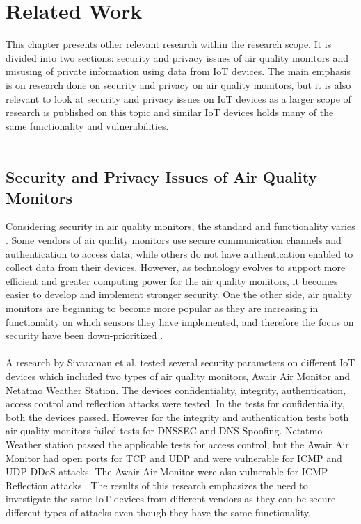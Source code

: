 \chapter{Related Work}
This chapter presents other relevant research within the research scope. It is divided into two sections: security and privacy issues of air quality monitors and misusing of private information using data from IoT devices. The main emphasis is on research done on security and privacy on air quality monitors, but it is also relevant to look at security and privacy issues on IoT devices as a larger scope of research is published on this topic and similar IoT devices holds many of the same functionality and vulnerabilities.\\\\
\section{Security and Privacy Issues of Air Quality Monitors}
Considering security in air quality monitors, the standard and functionality varies \cite{AQMHowFarFunctionality}. Some vendors of air quality monitors use secure communication channels and authentication to access data, while others do not have authentication enabled to collect data from their devices. However, as technology evolves to support more efficient and greater computing power for the air quality monitors, it becomes easier to develop and implement stronger security. One the other side, air quality monitors are beginning to become more popular as they are increasing in functionality on which sensors they have implemented, and therefore the focus on security have been down-prioritized \cite{SecurityAndDataIntInAQM}.
\\\\ 
A research by Sivaraman et al. \cite{IoTSecurityandPrivacyImpl} tested several security parameters on different IoT devices which included two types of air quality monitors, Awair Air Monitor and Netatmo Weather Station. The devices confidentiality, integrity, authentication, access control and reflection attacks were tested. In the tests for confidentiality, both the devices passed. However for the integrity and authentication tests both air quality monitors failed tests for DNSSEC and DNS Spoofing. Netatmo Weather station passed the applicable tests for access control, but the Awair Air Monitor had open ports for TCP and UDP and were vulnerable for ICMP and UDP DDoS attacks. The Awair Air Monitor were also vulnerable for ICMP Reflection attacks \cite{IoTSecurityandPrivacyImpl}. The results of this research emphasizes the need to investigate the same IoT devices from different vendors as they can be secure different types of attacks even though they have the same functionality. 
